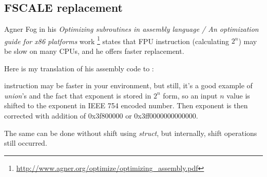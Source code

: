 \subsection{FSCALE replacement}

Agner Fog in his \emph{Optimizing subroutines in assembly language / An optimization guide for x86 platforms} work
\footnote{\url{http://www.agner.org/optimize/optimizing_assembly.pdf}} states that  \ac{FPU} instruction
(calculating $2^n$) may be slow on many CPUs, and he offers faster replacement.

Here is my translation of his assembly code to \CCpp:



 instruction may be faster in your environment, but still, it's a good example of \emph{union}'s and the fact
that exponent is stored in $2^n$ form,
so an input $n$ value is shifted to the exponent in IEEE 754 encoded number.
Then exponent is then corrected with addition of 0x3f800000 or 0x3ff0000000000000.

The same can be done without shift using \emph{struct}, but internally, shift operations still occurred.

